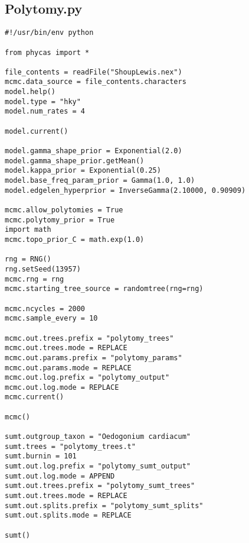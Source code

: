 \documentclass{article}
\begin{document}
\subsection{Polytomy.py}\label{Polytomy}
\begin{verbatim}
#!/usr/bin/env python

from phycas import *

file_contents = readFile("ShoupLewis.nex")
mcmc.data_source = file_contents.characters
model.help()
model.type = "hky"
model.num_rates = 4

model.current()

model.gamma_shape_prior = Exponential(2.0)
model.gamma_shape_prior.getMean()
model.kappa_prior = Exponential(0.25)
model.base_freq_param_prior = Gamma(1.0, 1.0)
model.edgelen_hyperprior = InverseGamma(2.10000, 0.90909)

mcmc.allow_polytomies = True
mcmc.polytomy_prior = True
import math
mcmc.topo_prior_C = math.exp(1.0)

rng = RNG()
rng.setSeed(13957)
mcmc.rng = rng
mcmc.starting_tree_source = randomtree(rng=rng)

mcmc.ncycles = 2000
mcmc.sample_every = 10

mcmc.out.trees.prefix = "polytomy_trees"
mcmc.out.trees.mode = REPLACE 
mcmc.out.params.prefix = "polytomy_params"
mcmc.out.params.mode = REPLACE 
mcmc.out.log.prefix = "polytomy_output"
mcmc.out.log.mode = REPLACE 
mcmc.current()

mcmc()

sumt.outgroup_taxon = "Oedogonium cardiacum"
sumt.trees = "polytomy_trees.t" 
sumt.burnin = 101 
sumt.out.log.prefix = "polytomy_sumt_output"
sumt.out.log.mode = APPEND 
sumt.out.trees.prefix = "polytomy_sumt_trees"
sumt.out.trees.mode = REPLACE 
sumt.out.splits.prefix = "polytomy_sumt_splits"
sumt.out.splits.mode = REPLACE 

sumt()
\end{verbatim}


\newpage
\end{document}
